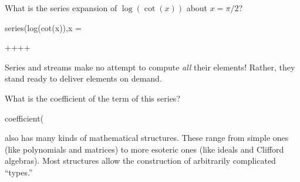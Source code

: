 %
\begin{xtc}
\begin{xtccomment}
What is the series expansion
of $\log(\cot(x))$
about $x=\pi/2$?
\end{xtccomment}
\begin{spadsrc}
series(log(cot(x)),x = %
\end{spadsrc}
\begin{TeXOutput}
\begin{fricasmath}{1}
+\TIMES {}+\TIMES {}+\TIMES {}+%
\end{fricasmath}
\end{TeXOutput}
\end{xtc}

Series and streams make no attempt to compute {\it all} their elements!
Rather, they stand ready to deliver elements on demand.

%
\begin{xtc}
\begin{xtccomment}
What is the coefficient of the 
term of this series?
\end{xtccomment}
\begin{spadsrc}
coefficient(%
\end{spadsrc}
\begin{TeXOutput}
\begin{fricasmath}{2}
%
\end{fricasmath}
\end{TeXOutput}
\end{xtc}


\Language{} also has many kinds of mathematical structures.
These range from simple ones (like polynomials and matrices) to
more esoteric ones (like ideals and Clifford algebras).
Most structures allow the construction of arbitrarily complicated
``types.''


